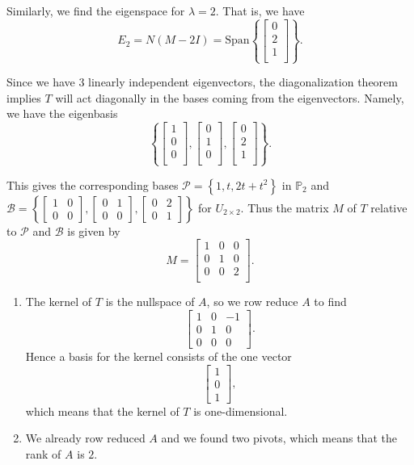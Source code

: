 \documentclass[12pt,letterpaper]{article}
\begin{document}
\begin{enumerate}
Similarly, we find the eigenspace for $\lambda=2$.  That is, we have
$$E_2 = N(M-2I)= \text{Span}\left\{  \begin{bmatrix} 0\\2\\1\\ \end{bmatrix}\right\}.$$

Since we have 3 linearly independent eigenvectors, the diagonalization theorem implies $T$ will act diagonally in the bases coming from the eigenvectors.  Namely, we have the eigenbasis $$\left\{  \begin{bmatrix} 1\\0\\0\\\end{bmatrix}, \begin{bmatrix} 0\\1\\0\\\end{bmatrix}, \begin{bmatrix} 0\\2\\1\\ \end{bmatrix}\right\}.$$  

This gives the corresponding bases $\mathcal{P} =\left\{1, t, 2t+t^2 \right \}$ in $\mathbb{P}_2$ and $ \mathcal{B}= \left\{  \begin{bmatrix} 1 & 0\\ 0 & 0\end{bmatrix}, \begin{bmatrix} 0 & 1\\ 0 & 0\end{bmatrix}, \begin{bmatrix} 0 & 2\\ 0 & 1\end{bmatrix}\right\}$ for $U_{2 \times 2}$.  Thus the matrix $M$ of $T$ relative to $\mathcal{P}$ and $\mathcal{B}$ is given by
$$M=\begin{bmatrix}
1 & 0 & 0\\
0 & 1 & 0\\
0 & 0 & 2\\
\end{bmatrix}.$$
\Answer 
\begin{enumerate}
\item The kernel of $T$ is the nullspace of $A$, so we row reduce $A$ to
find 
$$\begin{bmatrix} 1 & 0 & -1 \\ 0 & 1 & 0 \\ 0 & 0 & 0\end{bmatrix}.$$
Hence a basis for the kernel consists of the one vector
$$\begin{bmatrix}1\\0\\1\end{bmatrix},$$ 
which means that the kernel of $T$ is one-dimensional.
\item We already row reduced $A$ and we found two pivots, which means that
the rank of $A$ is $2$.


\end{enumerate}
\end{enumerate}
\end{document}
